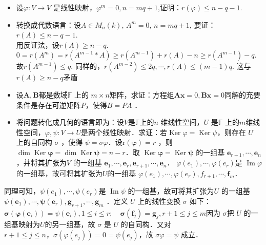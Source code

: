 \documentclass[14pt]{beamer}
\begin{document}
\begin{frame}
\begin{itemize}
\item<1-> 设$\varphi: V \rightarrow V$ 是线性映射，$\varphi^m=0,n=mq+1$,证明：$r(\varphi) \leq n-q-1$.
\item<2-> 转换成代数语言：设$A \in M_n (k)$,  $A^m=0$, $n=mq+1$, 要证：$r(A) \leq n-q-1$.\\
用反证法，设$r(A) \geq n-q$.\\
$0=r(A^m)=r(A^{m-1}*A) \geq r(A^{m-1})+r(A)-n \geq r(A^{m-1})-q$.\\
故$r(A^{m-1}) \leq q$. 同样的，$r(A^{m-2}) \leq 2q, \cdots, r(A) \leq (m-1)q$.
这与$r(A) \geq n-q$矛盾
\end{itemize}
\end{frame}

\begin{frame}
	\begin{itemize}
		 \item<1-> 设$  \boldsymbol{A}, \boldsymbol{B}  $都是数域$  \mathbb{F} $ 上的 $ m \times n  $矩阵，求证：方程组$  \boldsymbol{A x}=0, \boldsymbol{B x}=0 $同解的充要条件是存在可逆矩阵$  P  $，使得$  B=P A $ ．
		 \item<2-> 将问题转化成几何的语言即为：设$  V  $是$  \mathbb{F}  $上的$  n $ 维线性空间，$ U $ 是$  \mathbb{F} $ 上的$  m  $维线性空间，$ \varphi, \psi: V \rightarrow U  $是两个线性映射．求证：若$  \operatorname{Ker} \varphi=\operatorname{Ker} \psi  $，则存在 $ U $ 上的自同构 $ \sigma $ ，使得 $ \psi=\sigma \varphi  $．设$  \mathrm{r}(\boldsymbol{\varphi})=r $ ，则$  \operatorname{dim} \operatorname{Ker} \boldsymbol{\varphi}=\operatorname{dim} \operatorname{Ker} \boldsymbol{\psi}=n-r  $．取 $ \operatorname{Ker} \boldsymbol{\varphi}=\operatorname{Ker} \boldsymbol{\psi} $ 的一组基  $\boldsymbol{e}_{r+1}, \cdots, \boldsymbol{e}_{n}  $，并将其扩张为$  V $ 的一组基 $ \boldsymbol{e}_{1}, \cdots, \boldsymbol{e}_{r}, \boldsymbol{e}_{r+1}, \cdots, \boldsymbol{e}_{n}  $． $\varphi\left(e_{1}\right), \cdots, \varphi\left(e_{r}\right)  $是  $\operatorname{Im} \varphi  $的一组基，故可将其扩张为$  U  $的一组基  $\varphi\left(e_{1}\right), \cdots, \varphi\left(e_{r}\right), f_{r+1}, \cdots, \boldsymbol{f}_{m}  $．
	\end{itemize}
\end{frame}

\begin{frame}
	同理可知，$ \psi\left(e_{1}\right), \cdots, \psi\left(e_{r}\right)  $是 $ \operatorname{Im} \psi $ 的一组基，故可将其扩张为$  U$  的一组基 $ \psi\left(\boldsymbol{e}_{1}\right), \cdots, \boldsymbol{\psi}\left(\boldsymbol{e}_{r}\right), \boldsymbol{g}_{r+1}, \cdots, \boldsymbol{g}_{m} $ ．定义 $ U $ 上的线性变换  $\sigma$ 如下：$\boldsymbol{\sigma}\left(\boldsymbol{\varphi}\left(\boldsymbol{e}_{i}\right)\right)=\psi\left(\boldsymbol{e}_{i}\right), 1 \leq i \leq r ; \quad \boldsymbol{\sigma}\left(\boldsymbol{f}_{j}\right)=\boldsymbol{g}_{j}, r+1 \leq j \leq m$因为 $ \sigma  $把 $ U $ 的一组基映射为$  U  $的另一组基，故  $\sigma$  是 $ U $ 的自同构．又对  $r+1 \leq j \leq n  ，  \sigma\left(\varphi\left(e_{j}\right)\right)=0=\psi\left(e_{j}\right)  $，故 $ \sigma \varphi=\psi $ 成立． 
\end{frame}
\end{document}
